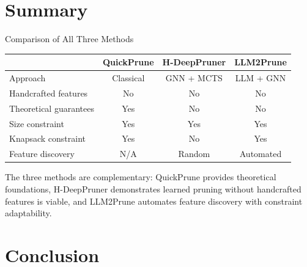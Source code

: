 \documentclass[aspectratio=169,xcolor=dvipsnames,8pt]{beamer}
\begin{document}
\section{Summary}

\begin{frame}{Comparison of All Three Methods}
  \begin{table}
    \centering
    \small
    \begin{tabular}{lccc}
      \toprule
      & QuickPrune & H-DeepPruner & LLM2Prune \\
      \midrule
      Approach & Classical & GNN + MCTS & LLM + GNN \\
      Handcrafted features & No & No & No \\
      Theoretical guarantees & Yes & No & No \\
      Size constraint & Yes & Yes & Yes \\
      Knapsack constraint & Yes & No & Yes \\
      Feature discovery & N/A & Random  & Automated  \\
      \bottomrule
    \end{tabular}
  \end{table}

  \vspace{0.3cm}

  The three methods are complementary: QuickPrune provides theoretical
  foundations, H-DeepPruner demonstrates learned pruning without handcrafted
  features is viable, and LLM2Prune automates feature discovery with constraint
  adaptability.
\end{frame}


\section{Conclusion}
\end{document}
